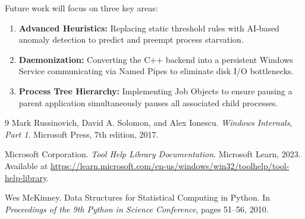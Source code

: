 \documentclass{article}
\begin{document}
Future work will focus on three key areas:
\begin{enumerate}
    \item \textbf{Advanced Heuristics:} Replacing static threshold rules with AI-based anomaly detection to predict and preempt process starvation.
    \item \textbf{Daemonization:} Converting the C++ backend into a persistent Windows Service communicating via Named Pipes to eliminate disk I/O bottlenecks.
    \item \textbf{Process Tree Hierarchy:} Implementing Job Objects to ensure pausing a parent application simultaneously pauses all associated child processes.
\end{enumerate}


\begin{thebibliography}{9}
Mark Russinovich, David A. Solomon, and Alex Ionescu. \textit{Windows Internals, Part 1}. Microsoft Press, 7th edition, 2017.

Microsoft Corporation. \textit{Tool Help Library Documentation}. Microsoft Learn, 2023. Available at \url{https://learn.microsoft.com/en-us/windows/win32/toolhelp/tool-help-library}.

Wes McKinney. Data Structures for Statistical Computing in Python. In \textit{Proceedings of the 9th Python in Science Conference}, pages 51--56, 2010.
\end{thebibliography}
\end{document}
